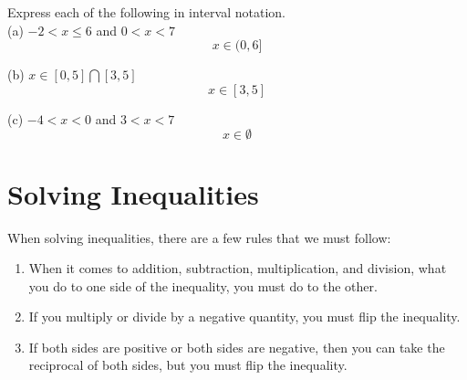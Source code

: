 \begin{exercise}\nonumber
	Express each of the following in interval notation. \\

	(a) $ -2 < x \le 6 $ and $ 0 < x < 7 $ \\
	$$
		x \in (0, 6]
	$$

	(b) $ x \in [0, 5] \bigcap [3, 5] $ \\
	$$
		x \in [3, 5]
	$$

	(c) $ -4 < x < 0 $ and $ 3 < x < 7 $ \\
	$$
		x \in \emptyset
	$$
\end{exercise}

\section{Solving Inequalities}

When solving inequalities, there are a few rules that we must follow: \\

\begin{enumerate}
	\item
	      When it comes to addition, subtraction, multiplication, and division, what you do to one side of the inequality, you must do to the other. \\

	\item
	      If you multiply or divide by a negative quantity, you must flip the inequality. \\

	\item
	      If both sides are positive or both sides are negative, then you can take the reciprocal of both sides, but you must flip the inequality. \\
\end{enumerate}

